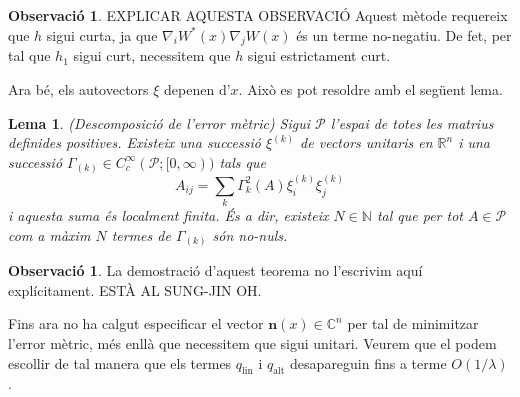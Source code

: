 \documentclass[11pt,a4paper,openright,oneside]{book}
\numberwithin{equation}{section}
\newtheorem{lema}[teo]{Lema}
\theoremstyle{definition}
\newtheorem{obs}[teo]{Observaci\'o}
\begin{document}
\begin{obs}
    {\color{blue} EXPLICAR AQUESTA OBSERVACIÓ}
    Aquest mètode requereix que $h$ sigui curta, ja que $\nabla_i W^*(x) \nabla_jW(x)$ és un terme no-negatiu. De fet, per tal que $h_1$ sigui curt, necessitem que $h$ sigui estrictament curt.
\end{obs}
Ara bé, els autovectors $\xi$ depenen d'$x$. Això es pot resoldre amb el següent lema.
\begin{lema} (Descomposició de l'error mètric)
    Sigui $\mathcal P$ l'espai de totes les matrius definides positives. Existeix una successió $\xi^{(k)}$ de vectors unitaris en $\mathbb R^n$ i una successió $\Gamma_{(k)}\in C_c^\infty(\mathcal P; [0,\infty))$ tals que
    \begin{equation*}
        A_{ij} = \sum_k\Gamma^2_{k}(A)\xi_i^{(k)}\xi_j^{(k)}
    \end{equation*}
    i aquesta suma és \textit{localment finita}. És a dir, existeix $N\in\mathbb N$ tal que per tot $A\in\mathcal P$ com a màxim $N$ termes de $\Gamma_{(k)}$ són no-nuls.
\end{lema}
\begin{obs}
    La demostració d'aquest teorema no l'escrivim aquí explícitament. {\color{blue} ESTÀ AL SUNG-JIN OH.}
\end{obs}
Fins ara no ha calgut especificar el vector $\textbf{n}(x)\in\mathbb C^n$ per tal de minimitzar l'error mètric, més enllà que necessitem que sigui unitari. Veurem que el podem escollir de tal manera que els termes $q_{\text{lin}}$ i $q_{\text{alt}}$ desapareguin fins a terme $O(1/\lambda)$.
\end{document}
